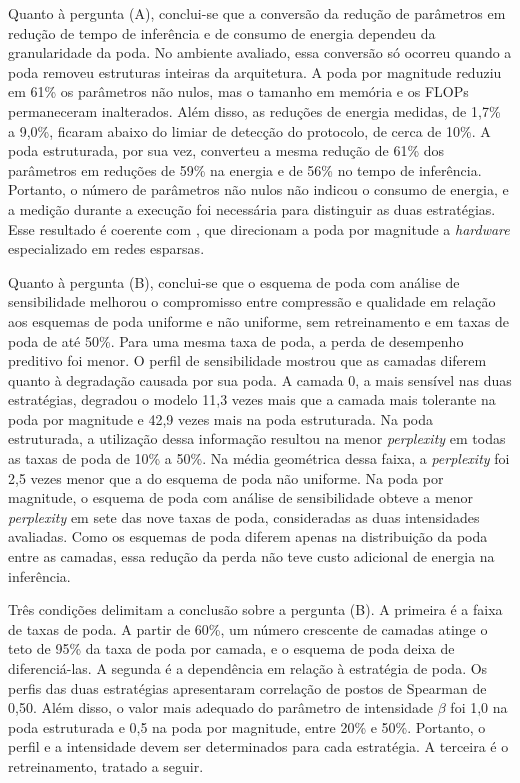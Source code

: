 Quanto à pergunta (A), conclui-se que a conversão da redução de parâmetros em redução de tempo
de inferência e de consumo de energia dependeu da granularidade da poda. No ambiente avaliado,
essa conversão só ocorreu quando a poda removeu estruturas inteiras da arquitetura. A poda por
magnitude reduziu em 61\% os parâmetros não nulos, mas o tamanho em memória e os FLOPs
permaneceram inalterados. Além disso, as reduções de energia medidas, de 1,7\% a 9,0\%, ficaram
abaixo do limiar de detecção do protocolo, de cerca de 10\%. A poda estruturada, por sua vez,
converteu a mesma redução de 61\% dos parâmetros em reduções de 59\% na energia e de 56\% no
tempo de inferência. Portanto, o número de parâmetros não nulos não
indicou o consumo de energia, e a medição durante a execução foi necessária para distinguir as
duas estratégias. Esse resultado é coerente com , que direcionam a poda por
magnitude a \textit{hardware} especializado em redes esparsas.

Quanto à pergunta (B), conclui-se que o esquema de poda com análise de sensibilidade melhorou o
compromisso entre compressão e qualidade em relação aos esquemas de poda uniforme e não
uniforme, sem retreinamento e em taxas de poda de até 50\%. Para uma mesma taxa de poda, a
perda de desempenho preditivo foi menor. O perfil de sensibilidade mostrou que as camadas
diferem quanto à degradação causada por sua poda. A camada 0, a mais sensível nas duas
estratégias, degradou o modelo 11,3 vezes mais que a camada mais tolerante na poda por
magnitude e 42,9 vezes mais na poda estruturada. Na poda
estruturada, a utilização dessa informação resultou na menor \textit{perplexity} em todas as
taxas de poda de 10\% a 50\%. Na média geométrica dessa faixa, a \textit{perplexity} foi 2,5
vezes menor que a do esquema de poda não uniforme. Na poda
por magnitude, o esquema de poda com análise de sensibilidade obteve a menor
\textit{perplexity} em sete das nove taxas de poda, consideradas as duas intensidades avaliadas.
Como os esquemas de poda diferem apenas na distribuição da
poda entre as camadas, essa redução da perda não teve custo adicional de energia na inferência.

Três condições delimitam a conclusão sobre a pergunta (B). A primeira é a faixa de taxas de
poda. A partir de 60\%, um número crescente de camadas atinge o teto de 95\% da taxa de poda
por camada, e o esquema de poda deixa de diferenciá-las. A
segunda é a dependência em relação à estratégia de poda. Os perfis das duas estratégias
apresentaram correlação de postos de Spearman de 0,50.
Além disso, o valor mais adequado do parâmetro de intensidade $\beta$ foi 1,0 na poda
estruturada e 0,5 na poda por magnitude, entre 20\% e 50\%.
Portanto, o perfil e a intensidade devem ser determinados para cada estratégia. A terceira é o
retreinamento, tratado a seguir.

